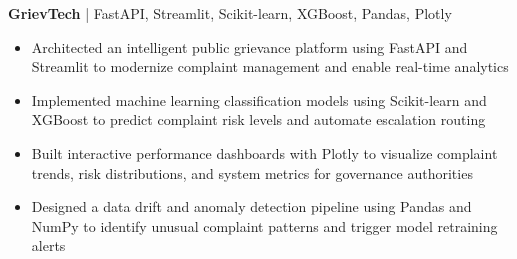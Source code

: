 \textbf{GrievTech} | FastAPI, Streamlit, Scikit-learn, XGBoost, Pandas, Plotly \\ %
\vspace{-9pt}
\begin{itemize}
  \item Architected an intelligent public grievance platform using FastAPI and Streamlit to modernize complaint management and enable real-time analytics
  \item Implemented machine learning classification models using Scikit-learn and XGBoost to predict complaint risk levels and automate escalation routing
  \item Built interactive performance dashboards with Plotly to visualize complaint trends, risk distributions, and system metrics for governance authorities
  \item Designed a data drift and anomaly detection pipeline using Pandas and NumPy to identify unusual complaint patterns and trigger model retraining alerts
\end{itemize}

\vspace{-18.5pt}